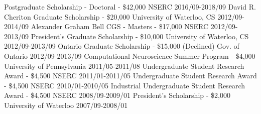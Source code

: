 \begin{cvhonors}
  \cvhonor
    {Postgraduate Scholarship - Doctoral - \$42,000}
    {NSERC}
    {2016/09-2018/09}
    {}
   \cvhonor
    {David R. Cheriton Graduate Scholarship - \$20,000}
    {University of Waterloo, CS}
    {2012/09-2014/09}
    {}
  \cvhonor
    {Alexander Graham Bell CGS - Masters - \$17,000}
    {NSERC}
    {2012/09-2013/09}
    {}
  \cvhonor
    {President's Graduate Scholarship - \$10,000}
    {University of Waterloo, CS}
    {2012/09-2013/09}
    {}
   \cvhonor
    {Ontario Graduate Scholarship - \$15,000 (Declined)}
    {Gov. of Ontario}
    {2012/09-2013/09}
    {}
   \cvhonor
    {Computational Neuroscience Summer Program - \$4,000}
    {University of Pennsylvania}
    {2011/05-2011/08}
    {}
   \cvhonor
    {Undergraduate Student Research Award - \$4,500}
    {NSERC}
    {2011/01-2011/05}
    {}
   \cvhonor
    {Undergraduate Student Research Award - \$4,500}
    {NSERC}
    {2010/01-2010/05}
    {}
   \cvhonor
    {Industrial Undergraduate Student Research Award - \$4,500}
    {NSERC}
    {2008/09-2009/01}
    {}
   \cvhonor
    {President's Scholarship - \$2,000}
    {University of Waterloo}
    {2007/09-2008/01}
    {}
\end{cvhonors}

